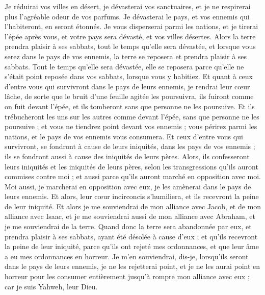 \begin{multicols}{2}
Je réduirai vos villes en désert, je dévasterai vos sanctuaires, et je ne respirerai plus l'agréable odeur de vos parfums.
Je dévasterai le pays, et vos ennemis qui l'habiteront, en seront étonnés.
Je vous disperserai parmi les nations, et je tirerai l'épée après vous, et votre pays sera dévasté, et vos villes désertes.
Alors la terre prendra plaisir à ses sabbats, tout le temps qu'elle sera dévastée, et lorsque vous serez dans le pays de vos ennemis, la terre se reposera et prendra plaisir à ses sabbats.
Tout le temps qu'elle sera dévastée, elle se reposera parce qu'elle ne s'était point reposée dans vos sabbats, lorsque vous y habitiez.
Et quant à ceux d'entre vous qui survivront dans le pays de leurs ennemis, je rendrai leur cœur lâche, de sorte que le bruit d'une feuille agitée les poursuivra, ils fuiront comme on fuit devant l'épée, et ils tomberont sans que personne ne les poursuive.
Et ils trébucheront les uns sur les autres comme devant l'épée, sans que personne ne les poursuive ; et vous ne tiendrez point devant vos ennemis ;
vous périrez parmi les nations, et le pays de vos ennemis vous consumera.
Et ceux d'entre vous qui survivront, se fondront à cause de leurs iniquités, dans les pays de vos ennemis ; ils se fondront aussi à cause des iniquités de leurs pères.
Alors, ils confesseront leurs iniquités et les iniquités de leurs pères, selon les transgressions qu'ils auront commises contre moi ; et aussi parce qu'ils auront marché en opposition avec moi.
Moi aussi, je marcherai en opposition avec eux, je les amènerai dans le pays de leurs ennemis. Et alors, leur cœur incirconcis s'humiliera, et ils recevront la peine de leur iniquité.
Et alors je me souviendrai de mon alliance avec Jacob, et de mon alliance avec Isaac, et je me souviendrai aussi de mon alliance avec Abraham, et je me souviendrai de la terre.
Quand donc la terre sera abandonnée par eux, et prendra plaisir à ses sabbats, ayant été désolée à cause d'eux ; et qu'ils recevront la peine de leur iniquité, parce qu'ils ont rejeté mes ordonnances, et que leur âme a eu mes ordonnances en horreur.
Je m'en souviendrai, dis-je, lorsqu'ils seront dans le pays de leurs ennemis, je ne les rejetterai point, et je ne les aurai point en horreur pour les consumer entièrement jusqu'à rompre mon alliance avec eux ; car je suis Yahweh, leur Dieu.

\end{multicols}
